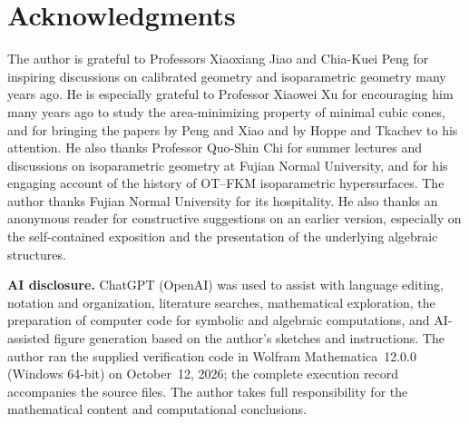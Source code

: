 \section*{Acknowledgments}

The author is grateful to Professors Xiaoxiang Jiao and Chia-Kuei Peng
for inspiring discussions on calibrated geometry and isoparametric
geometry many years ago. He is especially grateful to Professor
Xiaowei Xu for encouraging him many years ago to study the
area-minimizing property of minimal cubic cones, and for bringing
the papers by Peng and Xiao \cite{PengXiao93} and by Hoppe and
Tkachev \cite{HoppeTkachev19} to his attention. He also thanks
Professor Quo-Shin Chi for summer lectures and discussions on
isoparametric geometry at Fujian Normal University, and for his
engaging account of the history of OT--FKM isoparametric hypersurfaces.
The author thanks Fujian Normal University for its hospitality.
He also thanks an anonymous reader for constructive suggestions on an earlier
version, especially on the self-contained exposition and the presentation
of the underlying algebraic structures.

\bigskip
\noindent\textbf{AI disclosure.} ChatGPT (OpenAI) was used to assist
with language editing, notation and organization, literature searches,
mathematical exploration, the preparation of computer code for symbolic
and algebraic computations, and AI-assisted figure generation based on
the author's sketches and instructions. The author ran the supplied verification code
in Wolfram Mathematica~12.0.0 (Windows 64-bit) on October~12, 2026;
the complete execution record accompanies the source files.
The author takes full responsibility for the mathematical content and
computational conclusions.

